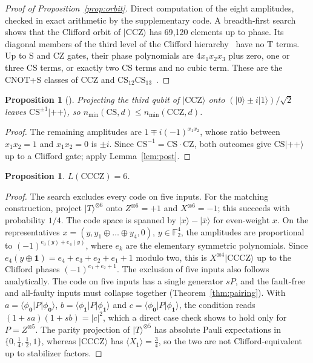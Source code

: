 \documentclass[aps,prl,reprint,twocolumn,amsmath,amssymb,floatfix,nofootinbib,superscriptaddress]{revtex4-2}
\newtheorem{proposition}[theorem]{Proposition}
\newcommand{\F}{\mathbb F_2}
\newcommand{\CCZ}{\mathrm{CCZ}}
\newcommand{\CCCZ}{\mathrm{CCCZ}}
\newcommand{\CS}{\mathrm{CS}}
\begin{document}
\begin{proof}[Proof of Proposition~\ref{prop:orbit}]
Direct computation of the eight amplitudes, checked in exact arithmetic by the supplementary code. A breadth-first search shows that the Clifford orbit of $|\CCZ\rangle$ has 69{,}120 elements up to phase. Its diagonal members of the third level of the Clifford hierarchy~\cite{gottesmanchuang} have no T terms. Up to S and CZ gates, their phase polynomials are $4x_1x_2x_3$ plus zero, one or three CS terms, or exactly two CS terms and no cubic term. These are the CNOT+S classes of CCZ and $\CS_{12}\CS_{13}$~\cite{wjs}.
\end{proof}

\begin{proposition}[{\cite[Proposition~A.4]{beverland}}]\label{prop:cs}
Projecting the third qubit of $|\CCZ\rangle$ onto $(|0\rangle\pm i|1\rangle)/\sqrt2$ leaves $\CS^{\pm1}|{+}{+}\rangle$, so $n_{\min}(\CS,d)\leq n_{\min}(\CCZ,d)$.
\end{proposition}
\begin{proof}
The remaining amplitudes are $1\mp i(-1)^{x_1x_2}$, whose ratio between $x_1x_2=1$ and $x_1x_2=0$ is $\pm i$. Since $\CS^{-1}=\CS\cdot\mathrm{CZ}$, both outcomes give $\CS|{+}{+}\rangle$ up to a Clifford gate; apply Lemma~\ref{lem:post}.
\end{proof}

\begin{proposition}\label{prop:cccz}
$L(\CCCZ)=6$.
\end{proposition}
\begin{proof}
The search excludes every code on five inputs. For the matching construction, project $|T\rangle^{\otimes6}$ onto $Z^{\otimes6}=+1$ and $X^{\otimes6}=-1$; this succeeds with probability $1/4$. The code space is spanned by $|x\rangle-|\bar x\rangle$ for even-weight $x$. On the representatives $x=(y,y_1\oplus\dots\oplus y_4,0)$, $y\in\F^4$, the amplitudes are proportional to $(-1)^{e_3(y)+e_4(y)}$, where $e_k$ are the elementary symmetric polynomials. Since $e_4(y\oplus\mathbf1)=e_4+e_3+e_2+e_1+1$ modulo two, this is $X^{\otimes4}|\CCCZ\rangle$ up to the Clifford phases $(-1)^{e_1+e_2+1}$. The exclusion of five inputs also follows analytically. The code on five inputs has a single generator $sP$, and the fault-free and all-faulty inputs must collapse together (Theorem~\ref{thm:pairing}). With $a=\langle\phi_{\mathbf0}|P|\phi_{\mathbf0}\rangle$, $b=\langle\phi_{\mathbf1}|P|\phi_{\mathbf1}\rangle$ and $c=\langle\phi_{\mathbf0}|P|\phi_{\mathbf1}\rangle$, the condition reads $(1+sa)(1+sb)=|c|^2$, which a direct case check shows to hold only for $P=Z^{\otimes5}$. The parity projection of $|T\rangle^{\otimes5}$ has absolute Pauli expectations in $\{0,\tfrac14,\tfrac12,1\}$, whereas $|\CCCZ\rangle$ has $\langle X_1\rangle=\tfrac34$, so the two are not Clifford-equivalent up to stabilizer factors.
\end{proof}
\end{document}
